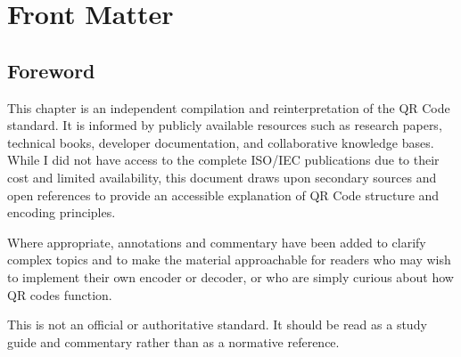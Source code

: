 \section{Front Matter}

\subsection{Foreword}




This chapter is an independent compilation and reinterpretation of the QR Code standard. 
It is informed by publicly available resources such as research papers, technical books, developer documentation, and collaborative knowledge bases. 
While I did not have access to the complete ISO/IEC publications due to their cost and limited availability, this document draws upon secondary sources and open references to provide an accessible explanation of QR Code structure and encoding principles.  

Where appropriate, annotations and commentary have been added to clarify complex topics and to make the material approachable for readers who may wish to implement their own encoder or decoder, or who are simply curious about how QR codes function.  

This is not an official or authoritative standard. It should be read as a study guide and commentary rather than as a normative reference.


